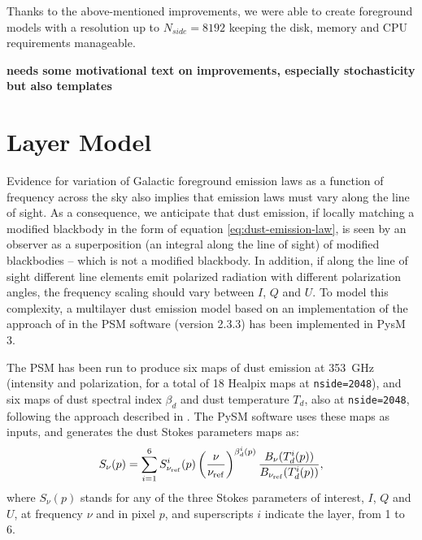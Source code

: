 \documentclass[twocolumn]{aastex631}
\begin{document}
Thanks to the above-mentioned improvements, we were able to create foreground models with a resolution up to $N_{side}=8192$ keeping the disk, memory and CPU requirements manageable. 

{\bf needs some motivational text on improvements, especially stochasticity but also templates}




\section{Layer Model} \label{sec:layers}

Evidence for variation of Galactic foreground emission laws as a function of frequency across the sky also implies that emission laws must vary along the line of sight. As a consequence, we anticipate that dust emission, if locally matching a modified blackbody in the form of equation \ref{eq:dust-emission-law}, is seen by an observer as a superposition (an integral along the line of sight) of modified blackbodies -- which is not a modified blackbody. In addition, if along the line of sight different line elements emit polarized radiation with different polarization angles, the frequency scaling should vary between $I$, $Q$ and $U$. To model this complexity, a multilayer dust emission model based on an implementation of the approach of \cite{Martinez-Solaeche:2018} in the PSM software (version 2.3.3) has been implemented in PysM 3.

The PSM has been run to produce six maps of dust emission at 353~GHz (intensity and polarization, for a total of 18 Healpix maps at {\tt nside=2048}), and six maps of dust spectral index $\beta_d$ and dust temperature $T_d$, also at {\tt nside=2048}, following the approach described in \cite{Martinez-Solaeche:2018}. The PySM software uses these maps as inputs, and generates the dust Stokes parameters maps as:
\begin{equation}
    S_\nu(p) = \sum_{i=1}^6 S^i_{\nu_{\rm ref}}(p)
    \left( \frac{\nu}{\nu_{\rm ref}} \right)^{\beta^i_d(p)}
    \frac{B_\nu(T^i_d(p))}{B_{\nu_{\rm ref}}(T^i_d(p))},
\end{equation}
where $S_\nu(p)$ stands for any of the three Stokes parameters of interest, $I$, $Q$ and $U$, at frequency $\nu$ and in pixel $p$, and superscripts $i$ indicate the layer, from 1 to 6.
\end{document}
